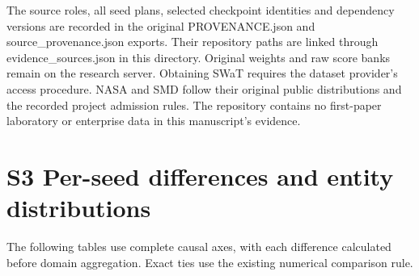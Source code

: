 \documentclass[
  english,
  9pt,
]{article}
\begin{document}
The source roles, all seed plans, selected checkpoint identities and
dependency versions are recorded in the original PROVENANCE.json and
source\_provenance.json exports. Their repository paths are linked
through evidence\_sources.json in this directory. Original weights and
raw score banks remain on the research server. Obtaining SWaT requires
the dataset provider's access procedure. NASA and SMD follow their
original public distributions and the recorded project admission rules.
The repository contains no first-paper laboratory or enterprise data in
this manuscript's evidence.

\section{S3 Per-seed differences and entity
distributions}\label{s3-per-seed-differences-and-entity-distributions}

The following tables use complete causal axes, with each difference
calculated before domain aggregation. Exact ties use the existing
numerical comparison rule.
\end{document}
